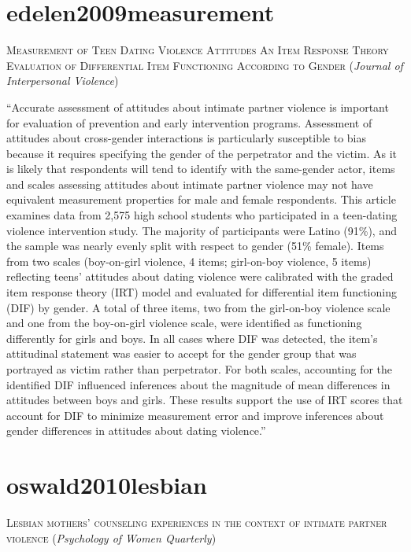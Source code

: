 \documentclass[]{tufte-handout}
\begin{document}
\section{\texorpdfstring{\textcolor[HTML]{5b0057}{edelen2009measurement}}{}}\label{section-40}

\textsc{\large{Measurement of Teen Dating Violence Attitudes An Item Response Theory Evaluation of Differential Item Functioning According to Gender}}
(\emph{Journal of Interpersonal Violence})

``Accurate assessment of attitudes about intimate partner violence is
important for evaluation of prevention and early intervention programs.
Assessment of attitudes about cross-gender interactions is particularly
susceptible to bias because it requires specifying the gender of the
perpetrator and the victim. As it is likely that respondents will tend
to identify with the same-gender actor, items and scales assessing
attitudes about intimate partner violence may not have equivalent
measurement properties for male and female respondents. This article
examines data from 2,575 high school students who participated in a
teen-dating violence intervention study. The majority of participants
were Latino (91\%), and the sample was nearly evenly split with respect
to gender (51\% female). Items from two scales (boy-on-girl violence, 4
items; girl-on-boy violence, 5 items) reflecting teens' attitudes about
dating violence were calibrated with the graded item response theory
(IRT) model and evaluated for differential item functioning (DIF) by
gender. A total of three items, two from the girl-on-boy violence scale
and one from the boy-on-girl violence scale, were identified as
functioning differently for girls and boys. In all cases where DIF was
detected, the item's attitudinal statement was easier to accept for the
gender group that was portrayed as victim rather than perpetrator. For
both scales, accounting for the identified DIF influenced inferences
about the magnitude of mean differences in attitudes between boys and
girls. These results support the use of IRT scores that account for DIF
to minimize measurement error and improve inferences about gender
differences in attitudes about dating violence.''

\section{\texorpdfstring{\textcolor[HTML]{5b0057}{oswald2010lesbian}}{}}\label{section-41}

\textsc{\large{Lesbian mothers' counseling experiences in the context of intimate partner violence}}
(\emph{Psychology of Women Quarterly})
\end{document}

